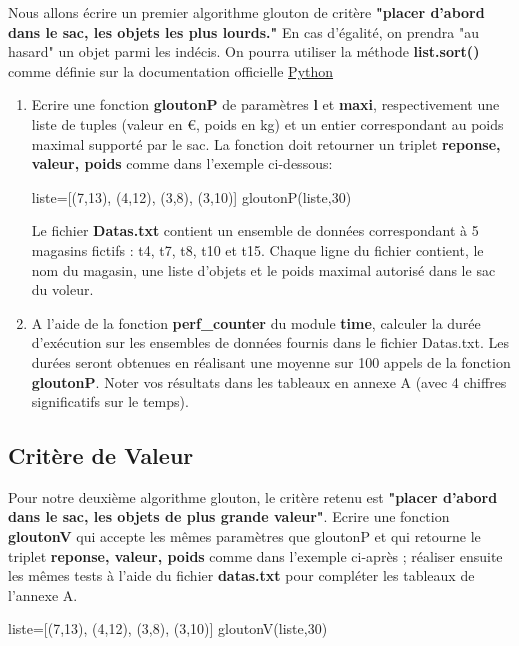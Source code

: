 \documentclass[12pt,french]{article}
\begin{document}
	Nous allons écrire un premier algorithme glouton de critère \textbf{"placer d'abord dans le sac, les objets les plus lourds."} En cas d'égalité, on prendra "au hasard" un objet parmi les indécis. On pourra utiliser la méthode \textbf{list.sort()} comme définie sur la documentation officielle \href{https://docs.python.org/fr/3/howto/sorting.html}{Python}	
	\begin{enumerate}
	\item Ecrire une fonction \textbf{gloutonP} de paramètres \textbf{l} et \textbf{maxi}, respectivement une liste de tuples (valeur en €, poids en kg) et un entier correspondant au poids maximal supporté par le sac.  La fonction doit retourner un triplet \textbf{reponse, valeur, poids} comme dans l'exemple ci-dessous:
	\begin{tcolorbox}[enhanced,attach boxed title to top center={yshift=-3mm,yshifttext=-1mm},
		colback=green!5!white,colframe=green!75!black,colbacktitle=green!25!black,
		title=Console Python, fonttitle=\bfseries,
		boxed title style={size=small,colframe=blue!25!black} ]
\begin{pyconsole}
liste=[(7,13), (4,12), (3,8), (3,10)]
gloutonP(liste,30)
		\end{pyconsole}
	\end{tcolorbox}
	Le fichier \textbf{Datas.txt} contient un ensemble de données correspondant à 5 magasins fictifs : t4, t7, t8, t10 et t15. Chaque ligne du fichier contient, le nom du magasin, une liste d'objets et le poids maximal autorisé dans le sac du voleur.	
	\item A l'aide de la fonction \textbf{perf\_counter} du module \textbf{time}, calculer la durée d'exécution sur les ensembles de données fournis dans le fichier Datas.txt. Les durées seront obtenues en réalisant une moyenne sur 100 appels de la fonction \textbf{gloutonP}. Noter vos résultats dans les tableaux en annexe A (avec 4 chiffres significatifs sur le temps). 
\end{enumerate}
	\subsection{Critère de Valeur}
	
	Pour notre deuxième algorithme glouton, le critère retenu est \textbf{"placer d'abord dans le sac, les objets de plus grande valeur"}. Ecrire une fonction \textbf{gloutonV} qui accepte les mêmes paramètres que gloutonP et qui retourne le triplet \textbf{reponse, valeur, poids} comme dans l'exemple ci-après ; réaliser ensuite les mêmes tests à l'aide du fichier  \textbf{datas.txt} pour compléter les tableaux de l'annexe A.
	\begin{tcolorbox}[enhanced,attach boxed title to top center={yshift=-3mm,yshifttext=-1mm},
		colback=green!5!white,colframe=green!75!black,colbacktitle=green!25!black,
		title=Console Python, fonttitle=\bfseries,
		boxed title style={size=small,colframe=blue!25!black} ]
\begin{pyconsole}
liste=[(7,13), (4,12), (3,8), (3,10)]
gloutonV(liste,30)
		\end{pyconsole}
	\end{tcolorbox}
	
\end{document}
